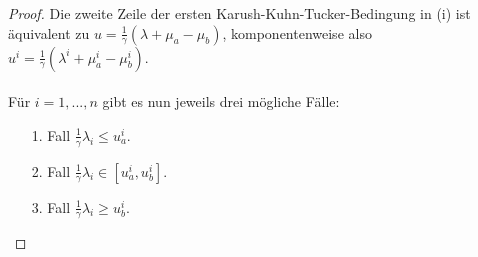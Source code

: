 \begin{compactenum}[(i)]
\begin{proof}
Die zweite Zeile der ersten Karush-Kuhn-Tucker-Bedingung in (i) ist äquivalent zu $u=\frac{1}{\gamma}(\lambda+\mu_a-\mu_b)$, komponentenweise also $u^i=\frac{1}{\gamma}(\lambda^i+\mu_a^i-\mu_b^i)$.\\\\
Für $i=1,...,n$ gibt es nun jeweils drei mögliche Fälle:
\begin{enumerate}
\item[1.] Fall $\frac{1}{\gamma}\lambda_i\leq u_a^i$. 
\item[2.] Fall $\frac{1}{\gamma}\lambda_i\in[u_a^i,u_b^i]$. 
\item[3.] Fall $\frac{1}{\gamma}\lambda_i\geq u_b^i$. 
\end{enumerate}
\end{proof}
\end{compactenum}
